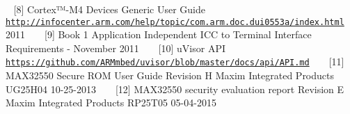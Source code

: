 ~\newline
\label{_r_e_f_e_r_e_n_c_e_s_DOC8}%
\hypertarget{_r_e_f_e_r_e_n_c_e_s_DOC8}{}%
\mbox{[}8\mbox{]} Cortex™-\/\+M4 Devices Generic User Guide \href{http://infocenter.arm.com/help/topic/com.arm.doc.dui0553a/index.html}{\tt http\+://infocenter.\+arm.\+com/help/topic/com.\+arm.\+doc.\+dui0553a/index.\+html} 2011 ~\newline
~\newline
\label{_r_e_f_e_r_e_n_c_e_s_DOC9}%
\hypertarget{_r_e_f_e_r_e_n_c_e_s_DOC9}{}%
\mbox{[}9\mbox{]} Book 1 Application Independent I\+CC to Terminal Interface Requirements -\/ November 2011 ~\newline
~\newline
\label{_r_e_f_e_r_e_n_c_e_s_DOC10}%
\hypertarget{_r_e_f_e_r_e_n_c_e_s_DOC10}{}%
\mbox{[}10\mbox{]} u\+Visor A\+PI \href{https://github.com/ARMmbed/uvisor/blob/master/docs/api/API.md}{\tt https\+://github.\+com/\+A\+R\+Mmbed/uvisor/blob/master/docs/api/\+A\+P\+I.\+md} ~\newline
~\newline
\label{_r_e_f_e_r_e_n_c_e_s_DOC11}%
\hypertarget{_r_e_f_e_r_e_n_c_e_s_DOC11}{}%
\mbox{[}11\mbox{]} M\+A\+X32550 Secure R\+OM User Guide Revision H Maxim Integrated Products U\+G25\+H04 10-\/25-\/2013 ~\newline
~\newline
\label{_r_e_f_e_r_e_n_c_e_s_DOC12}%
\hypertarget{_r_e_f_e_r_e_n_c_e_s_DOC12}{}%
\mbox{[}12\mbox{]} M\+A\+X32550 security evaluation report Revision E Maxim Integrated Products R\+P25\+T05 05-\/04-\/2015 